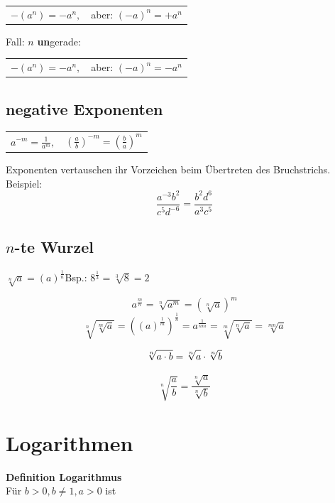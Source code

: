 \begin{multicols}{2}
\begin{tabular}{cc}
 $-(a^n) = -a^n,$ & aber: $(-a)^n = +a^n$
 \end{tabular} 

Fall: $n$ \textbf{un}gerade:

\begin{tabular}{cc}
 $-(a^n) = -a^n,$ & aber: $(-a)^n = -a^n$
 \end{tabular} 


\subsection*{negative Exponenten}


\begin{tabular}{cc}
$a^{-m} = \frac1{a^m},$ & $\left(\frac{a}b\right)^{-m} = \left(\frac{b}a\right)^m$
 \end{tabular}

Exponenten vertauschen ihr Vorzeichen beim Übertreten des
Bruchstrichs. Beispiel:
$$\frac{a^{-3}b^2}{c^5d^{-6}} = \frac{b^2d^6}{a^3c^5}$$


\subsection*{$n$-te Wurzel}
$\sqrt[n]{a} = \left(a\right)^\frac1n$\hfill{}Bsp.: $8^{\frac13}=\sqrt[3]{8}=2$

\begin{tcolorbox}[colback=white]
$$a^{\frac{m}n} = \sqrt[n]{a^m} = \left(\sqrt[n]a\right)^m$$
$$\sqrt[n]{\sqrt[m]{a}}   = \left((a)^\frac1m \right)^\frac1n =
  a^\frac1{nm} = \sqrt[m]{\sqrt[n]{a}}   = \sqrt[mn]{a}$$

  $$\sqrt[n]{a\cdot{}b} = \sqrt[n]{\vphantom{b}a} \cdot \sqrt[n]b$$

  $$\sqrt[n]{\frac{a}{b}} = \frac{\sqrt[n]a}{\sqrt[n]b}$$
\end{tcolorbox}

 
\hrulefill
\section*{Logarithmen}
\begin{tcolorbox}[colback=white]
  \textbf{Definition Logarithmus}\\
  Für $b>0, b\ne 1, a>0$ ist


\end{tcolorbox}
\end{multicols}
